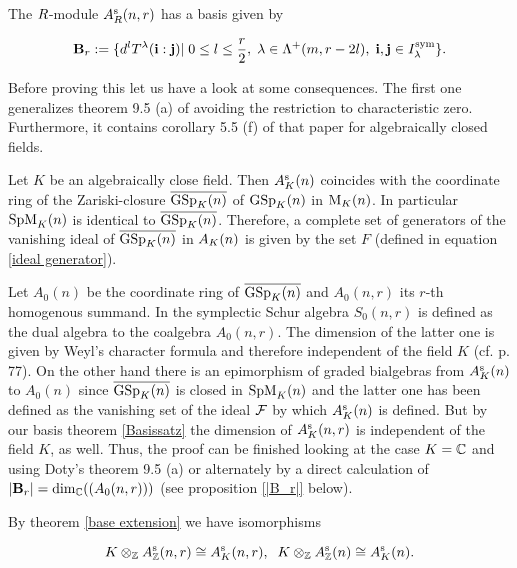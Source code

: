 \documentclass[twoside,12pt]{article}
\begin{document}
\begin{thm} \label{Basissatz}
The $\gr$-module  $\rsAn{\gr} r$ has a basis given by

\[ \B_r:=\{ {\spq}^l\bidet{\lambda}{\ibf i}{\ibf j}|\; 0\leq l \leq 
\frac r2, \; \lambda \in \prt m{r-2l},\;
\ibf i,\ibf j \in \symind{\lambda}\}. \]
\end{thm}

Before proving this let us have a look at some consequences. The first
one generalizes theorem 9.5 (a) of \cite{doty} avoiding the
restriction to characteristic zero. Furthermore, it contains corollary
5.5 (f) of that paper for algebraically closed fields.

\begin{cor} \label{Koordinatenring beliebig}
Let $K$ be an algebraically close field. Then $\sAn K$ coincides with
the coordinate ring of the Zariski-closure $\zgsp nK$ 
of $\gsp nK$ in $\gmhg nK$.
In particular $\gspm nK$ is identical to $\zgsp nK$. Therefore, a complete set
of generators of the vanishing ideal of $\zgsp nK$ in $\An K$ is given by the set
$F$ (defined in equation \ref{ideal generator}).
\end{cor}

\begin{Pf}
Let $A_0(n)$ be the  coordinate ring
of $\zgsp nK$ and $A_0(n,r)$ its $r$-th homogenous summand.
In \cite{donk3} the symplectic Schur algebra
$S_0(n,r)$ is defined as the dual algebra to the coalgebra $A_0(n,r)$.
The dimension of the latter one is given by Weyl's character formula
and therefore independent of the field $K$ (cf. \cite{donk3} p. 77).
On the other hand there is an epimorphism of graded bialgebras from
$\sAn K$ to $A_0(n)$ since $\zgsp nK$ is closed in $\gspm nK$ and
the latter one has been defined as the vanishing set of the ideal
${\cal F}$ by which $\sAn K$ is defined. But by our basis theorem
\ref{Basissatz} the dimension of $\rsAn Kr$ is independent of the
field $K$, as well. Thus, the proof can be finished looking at the
case $K=\C$ and using
Doty's theorem 9.5 (a) or alternately by a direct calculation of
$|\B_r|=\Dim{\C}{(A_0(n,r))}$ (see proposition \ref{|B_r|} below).
\end{Pf}


By theorem \ref{base extension} we have isomorphisms

\[ K\otimes_{\Z}\rsAn{\Z} r \cong \rsAn Kr,\;\; 
 K\otimes_{\Z}\sAn{\Z}  \cong \sAn K.\]
\end{document}
